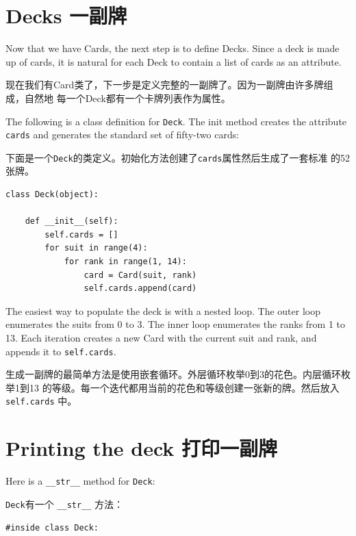 \documentclass[10pt]{book}
\begin{document}
\begin{CJK}{UTF8}{gbsn}
\begin{exercise}
\end{exercise}


\section{Decks 一副牌}

Now that we have Cards, the next step is to define Decks.  Since a
deck is made up of cards, it is natural for each Deck to contain a
list of cards as an attribute.

现在我们有Card类了，下一步是定义完整的一副牌了。因为一副牌由许多牌组成，自然地
每一个Deck都有一个卡牌列表作为属性。

The following is a class definition for {\tt Deck}.  The
init method creates the attribute {\tt cards} and generates
the standard set of fifty-two cards:

下面是一个{\tt Deck}的类定义。初始化方法创建了{\tt cards}属性然后生成了一套标准
的52张牌。

\begin{verbatim}
class Deck(object):

    def __init__(self):
        self.cards = []
        for suit in range(4):
            for rank in range(1, 14):
                card = Card(suit, rank)
                self.cards.append(card)
\end{verbatim}
%
The easiest way to populate the deck is with a nested loop.  The outer
loop enumerates the suits from 0 to 3.  The inner loop enumerates the
ranks from 1 to 13.  Each iteration
creates a new Card with the current suit and rank,
and appends it to {\tt self.cards}.

生成一副牌的最简单方法是使用嵌套循环。外层循环枚举0到3的花色。内层循环枚举1到13
的等级。每一个迭代都用当前的花色和等级创建一张新的牌。然后放入{\tt self.cards}
中。


\section{Printing the deck 打印一副牌}
\label{printdeck}

Here is a \verb"__str__" method for {\tt Deck}:

{\tt Deck}有一个 \verb"__str__" 方法：

\begin{verbatim}
#inside class Deck:


\end{verbatim}
\end{CJK}
\end{document}
